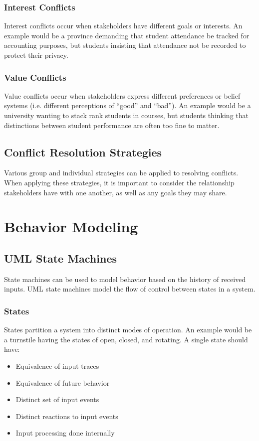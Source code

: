 \documentclass[12pt,titlepage]{article}
\begin{document}
      \subsubsection{Interest Conflicts}
        Interest conflicts occur when stakeholders have different goals or interests. An example would be a province demanding that student
        attendance be tracked for accounting purposes, but students insisting that attendance not be recorded to protect their privacy.

      \subsubsection{Value Conflicts}
        Value conflicts occur when stakeholders express different preferences or belief systems (i.e. different perceptions of ``good'' and ``bad'').
        An example would be a university wanting to stack rank students in courses, but students thinking that distinctions between student
        performance are often too fine to matter.

    \subsection{Conflict Resolution Strategies}
      Various group and individual strategies can be applied to resolving conflicts. When applying these strategies, it is important to consider
      the relationship stakeholders have with one another, as well as any goals they may share.

  \newpage

  \section{Behavior Modeling}

    \subsection{UML State Machines}
      State machines can be used to model behavior based on the history of received inputs. UML state machines model the flow of control between
      states in a system.

      \subsubsection{States}
        States partition a system into distinct modes of operation. An example would be a turnstile having the states of open, closed, and rotating.
        A single state should have:
        \begin{itemize}
          \item Equivalence of input traces
          \item Equivalence of future behavior
          \item Distinct set of input events
          \item Distinct reactions to input events
          \item Input processing done internally
        \end{itemize}
\end{document}
